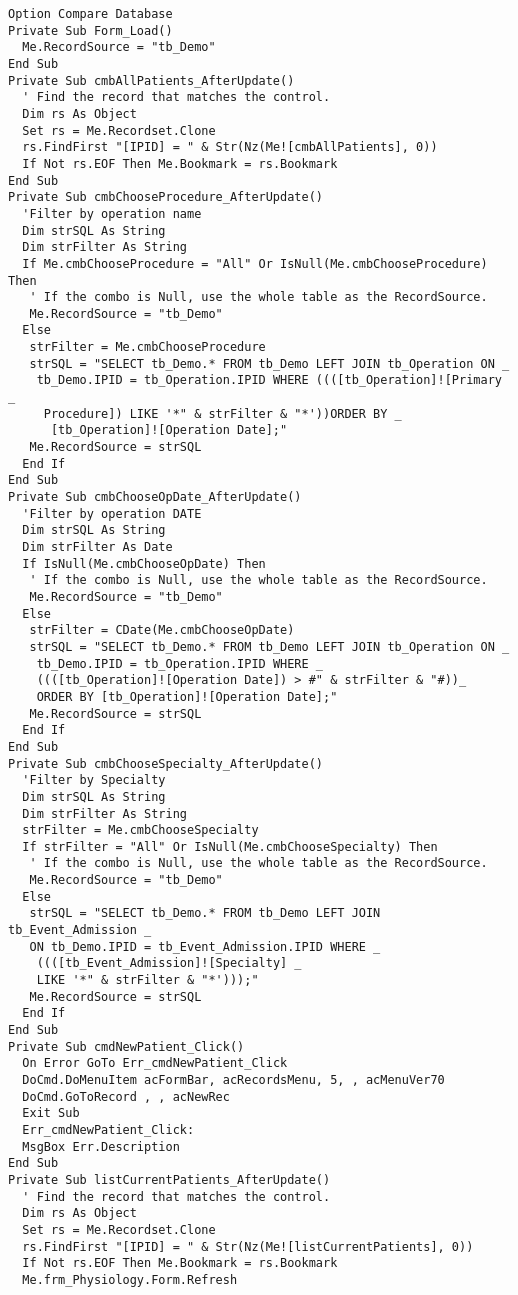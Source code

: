 \begin{lstlisting}
Option Compare Database
Private Sub Form_Load()
  Me.RecordSource = "tb_Demo"
End Sub
Private Sub cmbAllPatients_AfterUpdate()
  ' Find the record that matches the control.
  Dim rs As Object
  Set rs = Me.Recordset.Clone
  rs.FindFirst "[IPID] = " & Str(Nz(Me![cmbAllPatients], 0))
  If Not rs.EOF Then Me.Bookmark = rs.Bookmark
End Sub
Private Sub cmbChooseProcedure_AfterUpdate()
  'Filter by operation name
  Dim strSQL As String
  Dim strFilter As String
  If Me.cmbChooseProcedure = "All" Or IsNull(Me.cmbChooseProcedure) Then
   ' If the combo is Null, use the whole table as the RecordSource.
   Me.RecordSource = "tb_Demo"
  Else
   strFilter = Me.cmbChooseProcedure
   strSQL = "SELECT tb_Demo.* FROM tb_Demo LEFT JOIN tb_Operation ON _
    tb_Demo.IPID = tb_Operation.IPID WHERE ((([tb_Operation]![Primary _
     Procedure]) LIKE '*" & strFilter & "*'))ORDER BY _
      [tb_Operation]![Operation Date];"
   Me.RecordSource = strSQL
  End If
End Sub
Private Sub cmbChooseOpDate_AfterUpdate()
  'Filter by operation DATE
  Dim strSQL As String
  Dim strFilter As Date
  If IsNull(Me.cmbChooseOpDate) Then
   ' If the combo is Null, use the whole table as the RecordSource.
   Me.RecordSource = "tb_Demo"
  Else
   strFilter = CDate(Me.cmbChooseOpDate)
   strSQL = "SELECT tb_Demo.* FROM tb_Demo LEFT JOIN tb_Operation ON _
    tb_Demo.IPID = tb_Operation.IPID WHERE _
    ((([tb_Operation]![Operation Date]) > #" & strFilter & "#))_
    ORDER BY [tb_Operation]![Operation Date];"
   Me.RecordSource = strSQL
  End If
End Sub
Private Sub cmbChooseSpecialty_AfterUpdate()
  'Filter by Specialty
  Dim strSQL As String
  Dim strFilter As String
  strFilter = Me.cmbChooseSpecialty
  If strFilter = "All" Or IsNull(Me.cmbChooseSpecialty) Then
   ' If the combo is Null, use the whole table as the RecordSource.
   Me.RecordSource = "tb_Demo"
  Else
   strSQL = "SELECT tb_Demo.* FROM tb_Demo LEFT JOIN tb_Event_Admission _
   ON tb_Demo.IPID = tb_Event_Admission.IPID WHERE _
    ((([tb_Event_Admission]![Specialty] _
    LIKE '*" & strFilter & "*')));"
   Me.RecordSource = strSQL
  End If
End Sub
Private Sub cmdNewPatient_Click()
  On Error GoTo Err_cmdNewPatient_Click
  DoCmd.DoMenuItem acFormBar, acRecordsMenu, 5, , acMenuVer70
  DoCmd.GoToRecord , , acNewRec
  Exit Sub
  Err_cmdNewPatient_Click:
  MsgBox Err.Description
End Sub
Private Sub listCurrentPatients_AfterUpdate()
  ' Find the record that matches the control.
  Dim rs As Object
  Set rs = Me.Recordset.Clone
  rs.FindFirst "[IPID] = " & Str(Nz(Me![listCurrentPatients], 0))
  If Not rs.EOF Then Me.Bookmark = rs.Bookmark
  Me.frm_Physiology.Form.Refresh

\end{lstlisting}
